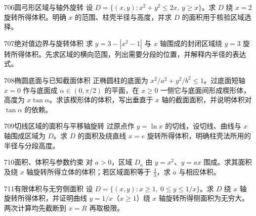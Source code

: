 \begin{exercise}{706}{圆弓形区域与轴外旋转}
设 $D=\{(x,y):x^2+y^2\le2x,\ y\ge x\}$。求 $D$ 绕 $x=2$ 旋转所得体积。明确 $x$ 的范围、柱壳半径与高度，并求 $D$ 的面积用于核验区域选择。
\end{exercise}
\begin{exercise}{707}{绝对值边界与旋转体积}
求 $y=3-|x^2-1|$ 与 $x$ 轴围成的封闭区域绕 $y=3$ 旋转所得体积。先求区域的横向范围，列出需要分段的位置，并解释内半径的表达式。
\end{exercise}
\begin{exercise}{708}{椭圆底面与已知截面体积}
正椭圆柱的底面为 $x^2/a^2+y^2/b^2\le1$。过底面短轴 $x=0$ 作与底面成 $\alpha\in(0,\pi/2)$ 的平面，在 $x\ge0$ 一侧它与底面间形成楔形体，高度为 $x\tan\alpha$。求该楔形体的体积，写出垂直于 $x$ 轴的截面面积，并说明体积对 $\tan\alpha$ 的依赖。
\end{exercise}
\begin{exercise}{709}{切线区域的面积与平移轴旋转}
过原点作 $y=\ln x$ 的切线，设切线、曲线与 $x$ 轴围成区域为 $D$。求 $D$ 的面积及绕直线 $x=e$ 旋转所得体积，明确柱壳法所用的半径与分段高度。
\end{exercise}
\begin{exercise}{710}{面积、体积与参数约束}
对 $a>0$，区域 $D_a$ 由 $y=x^2$、$y=ax$ 围成。求其面积及绕 $x$ 轴旋转所得立体的体积；若区域面积等于 $\frac43$，求 $a$ 与相应体积。
\end{exercise}
\begin{exercise}{711}{有限体积与无穷侧面积}
设 $D=\{(x,y):x\ge1,\ 0\le y\le1/x\}$。求 $D$ 绕 $x$ 轴旋转所得体积，并证明曲线 $y=1/x$（$x\ge1$）绕 $x$ 轴旋转所得侧面积为无穷大。两次计算均先截断到 $x=R$ 再取极限。
\end{exercise}
